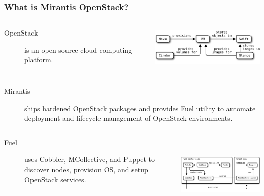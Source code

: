 \documentclass[hyperref=unicode,utf8,xcolor=pst,aspectratio=169]{beamer}
\begin{document}
\begin{frame}
	\frametitle{What is Mirantis OpenStack?}
	\begin{columns}[T]
		\begin{description}
			\item[OpenStack] is an open source cloud computing
				platform.
		\end{description}
		\includegraphics[height=2cm]{openstack-components}
	\end{columns}

	\begin{description}
		\item[Mirantis] ships hardened OpenStack packages and provides
			Fuel utility to automate deployment and lifecycle
			management of OpenStack environments.
	\end{description}

	\begin{columns}[T]
		\begin{description}
			\item[Fuel] uses Cobbler, MCollective, and Puppet to
				discover nodes, provision OS, and setup
				OpenStack services.\\
		\end{description}
		\includegraphics[height=3.8cm]{fuel-components}
	\end{columns}
\end{frame}
\end{document}
